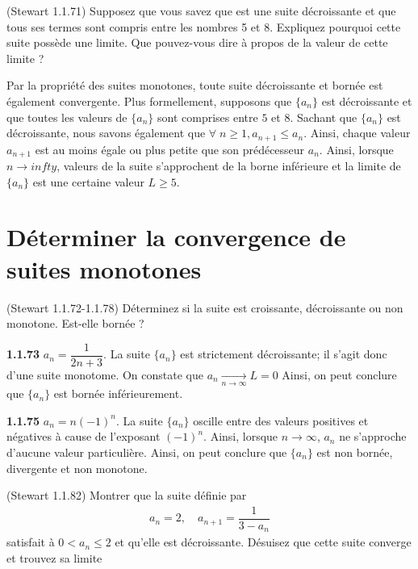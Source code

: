 \documentclass{report}
\begin{document}
    \begin{Exercice}{(Stewart 1.1.71)}{}
        Supposez que vous savez que est une suite décroissante
        et que tous ses termes sont compris entre les nombres 5 et 8.
        Expliquez pourquoi cette suite possède une limite. Que
        pouvez-vous dire à propos de la valeur de cette limite ?
    \end{Exercice}      

    Par la propriété des suites monotones, toute suite décroissante et bornée est également convergente. 
    Plus formellement, supposons que $\{a_n\}$ est décroissante et que toutes les valeurs de 
    $\{a_n\}$ sont comprises entre $5$ et $8$. Sachant que $\{a_n\}$ est décroissante, nous savons également que 
    $\forall \; n \geq 1, a_{n+1} \leq a_n$. Ainsi, chaque valeur $a_{n+1}$ est
    au moins  égale ou plus petite que son prédécesseur $a_n$. Ainsi, lorsque $n \to infty$, 
    valeurs de la suite s'approchent de la borne inférieure et la limite de $\{a_n \}$ 
    est une certaine valeur $L \geq 5$. 


    \section{Déterminer la convergence de suites monotones}

    \begin{Exercice}{(Stewart 1.1.72-1.1.78)}{}
        Déterminez si la suite est croissante, décroissante ou non monotone. Est-elle bornée ?
    \end{Exercice}

    \noindent \textbf{1.1.73} \; \( a_n = \dfrac{1}{2n + 3} \). La suite \( \{a_n \} \) est strictement décroissante; 
    il s'agit donc d'une suite monotome. On constate que $a_n \xrightarrow[n\to \infty]{} L = 0$ 
    Ainsi, on peut conclure que $\{ a_n\}$ est bornée inférieurement. 
    
    \vspace{2em}
    \noindent \textbf{1.1.75} \; \( a_n = n(-1)^n \). La suite \( \{a_n \} \) oscille entre des valeurs 
    positives et négatives à cause de l'exposant $(-1)^n$. Ainsi, lorsque $n\to \infty$, 
    $a_n$ ne s'approche d'aucune valeur particulière. Ainsi, on peut conclure que 
    $\{a_n \}$ est non bornée, divergente et non monotone. 

    \begin{Exercice}{(Stewart 1.1.82)}{}
        Montrer que la suite définie par 
        \begin{align*}
                a_n = 2, \quad  a_{n+1} = \dfrac{1}{3 - a_n} 
        \end{align*}
        satisfait à $0 < a_n \leq 2$ et qu'elle est décroissante. Désuisez que cette suite 
        converge et trouvez sa limite
    \end{Exercice}
\end{document}
